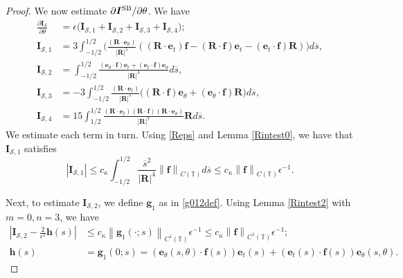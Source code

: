 \documentclass[11pt]{article}
\numberwithin{equation}{section}
\newcommand{\T}{\mathbb{T}}
\newcommand{\bars}{\overline s}
\newcommand{\be}{\bm{e}}
\newcommand{\p}{\partial}
\newcommand{\SB}{{\rm SB}}
\newcommand{\abs}[1]{\left\lvert #1 \right\rvert}
\newcommand{\norm}[1]{\left\lVert #1 \right\rVert}
\newcommand{\mc}[1]{\mathcal{#1}}
\theoremstyle{definition}
\begin{document}
\begin{proof}
We now estimate $\p\bm{I}^{\SB}/\p \theta$. We have
\begin{equation}\label{ISstheta}
\begin{split}
\frac{\p \bm{I}_{\mc S}}{\p \theta} &= \epsilon\big(\bm{I}_{\mc{S},1}+\bm{I}_{\mc{S},2}+\bm{I}_{\mc{S},3}+\bm{I}_{\mc{S},4}\big);\\
%
\bm{I}_{\mc{S},1} &= 3\int_{-1/2}^{1/2}\bigg(\frac{(\bm{R}\cdot\be_\theta)}{\abs{\bm{R}}^5} ((\bm{R}\cdot\be_t)\bm{f}-(\bm{R}\cdot \bm{f})\be_t -(\be_t\cdot \bm{f})\bm{R}) \bigg) d\bars,\\
\bm{I}_{\mc{S},2} &= \int_{-1/2}^{1/2}\frac{(\be_\theta\cdot \bm{f})\be_t +(\be_t\cdot \bm{f})\be_\theta}{\abs{\bm{R}}^3}d\bars,\\
\bm{I}_{\mc{S},3} &= -3\int_{-1/2}^{1/2}\frac{(\bm{R}\cdot\be_t)}{\abs{\bm{R}}^5} \big((\bm{R}\cdot\bm{f})\bm{e}_\theta+(\bm{e}_\theta\cdot\bm{f})\bm{R} \big) d\bars,\\
\bm{I}_{\mc{S},4} &= 15\int_{1/2}^{1/2} \frac{(\bm{R}\cdot\be_t)(\bm{R}\cdot\bm{f})(\bm{R}\cdot\be_\theta)}{\abs{\bm{R}}^7}\bm{R}d\bars.
\end{split}
\end{equation}
We estimate each term in turn. Using \eqref{Reps} and Lemma \ref{Rintest0}, we have that $\bm{I}_{\mc{S},1}$ satisfies
\begin{equation}\label{IS1stheta}
\abs{\bm{I}_{\mc{S},1}} \le c_\kappa\int_{-1/2}^{1/2}\frac{\bars^2}{\abs{\bm{R}}^4}\norm{\bm{f}}_{C(\T)}d\bars
\le c_\kappa\norm{\bm{f}}_{C(\T)}\epsilon^{-1}.
\end{equation}


Next, to estimate $\bm{I}_{\mc{S},2}$, we define $\bm{g}_1$ as in \eqref{g012def}. Using Lemma \ref{Rintest2} with $m=0, n=3$, we have
\begin{equation}\label{hsdef}
\begin{split}
\abs{\bm{I}_{\mc{S},2}-\frac{2}{\epsilon^2}\bm{h}(s)} &\le c_\kappa\norm{\bm{g}_1(\cdot;s)}_{C^1(\T)}\epsilon^{-1}
\le c_\kappa\norm{\bm{f}}_{C^1(\T)}\epsilon^{-1}; \\
\bm{h}(s)&=\bm{g}_1(0;s) = (\be_\theta(s,\theta)\cdot \bm{f}(s))\be_t(s)+(\be_t(s)\cdot \bm{f}(s))\be_\theta(s,\theta).
\end{split}
\end{equation}


\end{proof}
\end{document}

